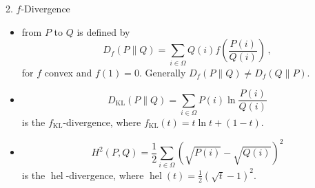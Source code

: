 \documentclass[final]{beamer}
\DeclareMathOperator{\hel}{hel}
\newcommand{\kl}[2]{D_{\mathrm{KL}}( #1 \parallel #2 )}
\newlength{\onecolwid}
\begin{document}
\begin{frame}[t]
\begin{columns}[t]
\begin{column}{\onecolwid}
		
	\begin{block}{2. $ f $-Divergence}
\begin{itemize}	
		\item	{}  from $ P $ 
		to $ Q $
			is defined by
			\begin{equation}\label{eq:definition_f_divergence}
			D_f(P\parallel Q) = \sum_{i\in \Omega} Q(i) f\left( 
			\frac{P(i)}{Q(i)} 
			\right) \,,
			\end{equation}
			for $ f $ convex and $ f(1)=0 $.
Generally
			$ D_f(P\parallel 
			Q)\ne 
			D_f(Q\parallel P) $.
			
			\item {} \[ \kl{P}{Q}= \sum_{i\in 
			\Omega} P(i) \ln\frac{P(i)}{Q(i)}  \] is the $ 
			f_{\mathrm{KL}} 
			$-divergence,
			where
			 $ f_{\mathrm{KL}}(t) = t\ln t + (1-t) $.
			
		\item	{}
	 \[ H^2(P,Q) = 
		\frac{1}{2} \sum_{i\in \Omega} 
		(\sqrt{P(i)}-\sqrt{Q(i)})^2 \] is 
		the $ \hel 
		$-divergence, where
			 $ \hel(t)=\frac{1}{2}(\sqrt{t}-1)^2 $.

			

\end{itemize}
\end{block}
\end{column}
\end{columns}
\end{frame}
\end{document}
